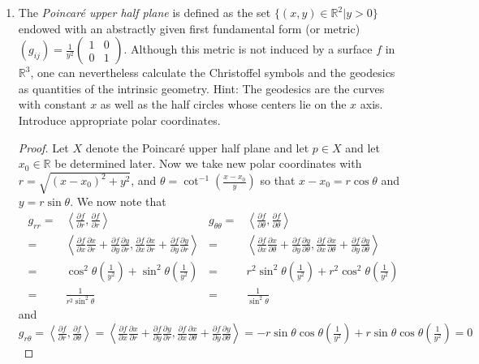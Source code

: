 \documentclass[12pt]{amsart}
\newcommand{\parti}[2]{\frac{\partial #1}{\partial #2}}
\newcommand{\inn}[1]{\left\langle #1\right\rangle}
\begin{document}
\begin{enumerate}
\newpage
	\item The \textit{Poincar\'e upper half plane} is defined as the set $\{(x,y)\in\mathbb{R}^2|y>0\}$ endowed with an abstractly given first fundamental form (or metric) $(g_{ij})=\frac{1}{y^2}\left(\begin{array}{cc} 1 & 0 \\ 0 & 1 \end{array}\right)$. Although this metric is not induced by a surface $f$ in $\mathbb{R}^3$, one can nevertheless calculate the Christoffel symbols and the geodesics as quantities of the intrinsic geometry. Hint: The geodesics are the curves with constant $x$ as well as the half circles whose centers lie on the $x$ axis. Introduce appropriate polar coordinates.
	\begin{proof}
		Let $X$ denote the Poincar\'e upper half plane and let $p\in X$ and let $x_0\in\mathbb{R}$ be determined later. Now we take new polar coordinates with $r=\sqrt{(x-x_0)^2+y^2}$, and $\theta=\cot^{-1}\left(\frac{x-x_0}{y}\right)$ so that $x-x_0=r\cos\theta$ and $y=r\sin\theta$. We now note that 
		\begin{align*}
			g_{rr}=&\inn{\parti{f}{r},\parti{f}{r}} & g_{\theta\theta}=&\inn{\parti{f}{\theta},\parti{f}{\theta}}
			\\=&\inn{\parti{f}{x}\parti{x}{r}+\parti{f}{y}\parti{y}{r},\parti{f}{x}\parti{x}{r}+\parti{f}{y}\parti{y}{r}} & =&\inn{\parti{f}{x}\parti{x}{\theta}+\parti{f}{y}\parti{y}{\theta},\parti{f}{x}\parti{x}{\theta}+\parti{f}{y}\parti{y}{\theta}}
			\\=&\cos^2\theta\left(\frac{1}{y^2}\right)+\sin^2\theta\left(\frac{1}{y^2}\right) & =&r^2\sin^2\theta\left(\frac{1}{y^2}\right)+r^2\cos^2\theta\left(\frac{1}{y^2}\right)
			\\=&\frac{1}{r^2\sin^2\theta} & =&\frac{1}{\sin^2\theta}
		\end{align*}
		and $g_{r\theta}=\inn{\parti{f}{r},\parti{f}{\theta}}=\inn{\parti{f}{x}\parti{x}{r}+\parti{f}{y}\parti{y}{r},\parti{f}{x}\parti{x}{\theta}+\parti{f}{y}\parti{y}{\theta}}=-r\sin\theta\cos\theta\left(\frac{1}{y^2}\right)+r\sin\theta\cos\theta\left(\frac{1}{y^2}\right)=0$


\end{proof}
\end{enumerate}
\end{document}
